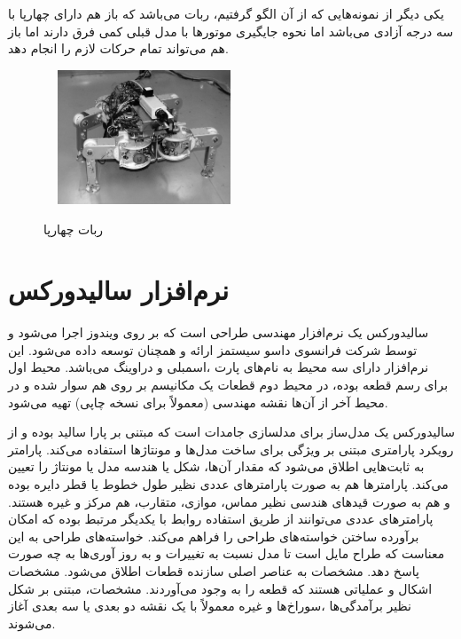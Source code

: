 \newpage	
یکی دیگر از نمونه‌هایی که از آن الگو گرفتیم، ربات 
می‌باشد که باز هم دارای چهارپا با سه درجه آزادی می‌باشد اما نحوه جایگیری موتورها با مدل قبلی کمی فرق دارند اما باز هم می‌تواند تمام حرکات لازم را انجام دهد\cite{Titan-VIII}.	
	\begin{figure}[!h]	
	\vspace{0.2cm}
	\centering
	\includegraphics[height=4cm,width=6cm]{./Images/CH2/4_Legged_Robot_TITAN-VIII.png}
	‌\caption[ربات چهارپا]{ربات چهارپا\cite{Titan-VIII}}
	\label{ربات تایتان}
	\end{figure}
	
\section[نرم‌افزار سالیدورکس]{نرم‌افزار سالیدورکس\cite{SolidWoks}}
سالیدورکس یک نرم‌افزار مهندسی طراحی است که بر روی ویندوز اجرا می‌شود و توسط شرکت فرانسوی داسو سیستمز ارائه و همچنان توسعه داده می‌شود. این نرم‌افزار دارای سه محیط به نام‌های پارت
\unskip{}
،اسمبلی
\unskip{}
و دراوینگ
\unskip{}
می‌باشد. محیط اول برای رسم قطعه بوده، در محیط دوم قطعات یک مکانیسم بر روی هم سوار شده و در محیط آخر از آن‌ها نقشه مهندسی (معمولاً برای نسخه چاپی) تهیه می‌شود.

سالیدورکس یک مدل‌ساز برای مدلسازی جامدات است که مبتنی بر پارا سالید بوده و از رویکرد پارامتری مبتنی بر ویژگی برای ساخت مدل‌ها و مونتاژها استفاده می‌کند. پارامتر به ثابت‌هایی اطلاق می‌شود که مقدار آن‌ها، شکل یا هندسه مدل یا مونتاژ را تعیین می‌کند. پارامترها هم به صورت پارامترهای عددی نظیر طول خطوط یا قطر دایره بوده و هم به صورت قیدهای هندسی نظیر مماس، موازی، متقارب، هم مرکز و غیره هستند. پارامترهای عددی می‌توانند از طریق استفاده روابط با یکدیگر مرتبط بوده که امکان برآورده ساختن خواسته‌های طراحی را فراهم می‌کند. خواسته‌های طراحی به این معناست که طراح مایل است تا مدل نسبت به تغییرات و به روز آوری‌ها به چه صورت پاسخ دهد. مشخصات
\unskip{}
به عناصر اصلی سازنده قطعات اطلاق می‌شود. مشخصات اشکال و عملیاتی هستند که قطعه را به وجود می‌آوردند. مشخصات، مبتنی بر شکل نظیر برآمدگی‌ها
\unskip{}
،سوراخ‌ها
\unskip{}
و غیره معمولاً با یک نقشه دو بعدی یا سه بعدی آغاز می‌شوند.

